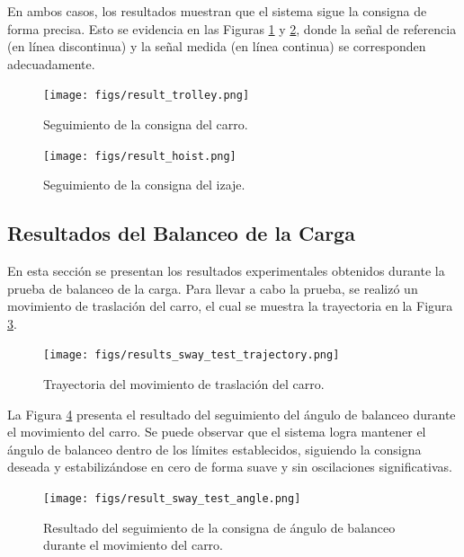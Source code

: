 \documentclass{article}
\begin{document}
            En ambos casos, los resultados muestran que el sistema sigue la consigna de forma precisa. Esto se evidencia en las Figuras \ref{fig:result_trolley} y \ref{fig:result_hoist}, donde la señal de referencia (en línea discontinua) y la señal medida (en línea continua) se corresponden adecuadamente.

            \begin{figure} [H]
            \centering
            \texttt{[image: figs/result\_trolley.png]}
            \caption{Seguimiento de la consigna del carro. }
            \label{fig:result_trolley}
            \end{figure}

            \begin{figure} [H]
            \centering
            \texttt{[image: figs/result\_hoist.png]}
            \caption{Seguimiento de la consigna del izaje. }
            \label{fig:result_hoist}
            \end{figure}

            
            \subsection{Resultados del Balanceo de la Carga}

            En esta sección se presentan los resultados experimentales obtenidos durante la prueba de balanceo de la carga. Para llevar a cabo la prueba, se realizó un movimiento de traslación del carro, el cual se muestra la trayectoria en la Figura \ref{fig:result_sway_test_trajectory}.

            \begin{figure} [H]
                \centering
                \texttt{[image: figs/results\_sway\_test\_trajectory.png]}
                \caption{Trayectoria del movimiento de traslación del carro.}
                \label{fig:result_sway_test_trajectory}
            \end{figure}

            La Figura \ref{fig:result_sway_test_angle} presenta el resultado del seguimiento del ángulo de balanceo durante el movimiento del carro. Se puede observar que el sistema logra mantener el ángulo de balanceo dentro de los límites establecidos, siguiendo la consigna deseada y estabilizándose en cero de forma suave y sin oscilaciones significativas.

            \begin{figure} [H]
                \centering
                \texttt{[image: figs/result\_sway\_test\_angle.png]}
                \caption{Resultado del seguimiento de la consigna de ángulo de balanceo durante el movimiento del carro.}
                \label{fig:result_sway_test_angle}
            \end{figure}
\end{document}
